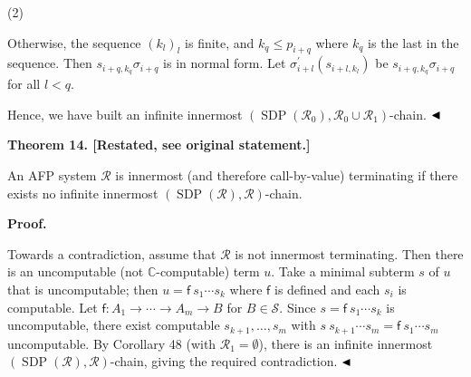 \documentclass[10pt,a4paper]{amsart}
\begin{document}
 
 
\par\noindent  (2) 
 
Otherwise, the sequence $(k_{l})_{l}$ is finite, and $k_{q}\leq p_{i+q}$ where $k_{q}$ is the last in the sequence. Then $s_{i+q,k_{q}}\sigma_{i+q}$ is in normal form. Let $\sigma^{\prime}_{i+l}(s_{i+l,k_{l}})$ be $s_{i+q,k_{q}}\sigma_{i+q}$ for all $l<q$.\par
 
 
  
 
 
Hence, we have built an infinite innermost $(\operatorname{SDP}(\mathcal{R}_{0}),\mathcal{R}_{0}\cup\mathcal{R}_{1})$-chain. $\hfill\blacktriangleleft$\par
 
 
 
 
\par\medskip\noindent\textbf{Theorem 14. [Restated, see original statement.]}\par
 
 
An AFP system $\mathcal{R}$ is innermost (and therefore call-by-value) terminating if there exists no infinite innermost $(\operatorname{SDP}(\mathcal{R}),\mathcal{R})$-chain.\par
 
 
 
 
 
 
\par\medskip\noindent\textbf{Proof.}\par
 
 
Towards a contradiction, assume that $\mathcal{R}$ is not innermost terminating. Then there is an uncomputable (not $\mathbb{C}$-computable) term $u$. Take a minimal subterm $s$ of $u$ that is uncomputable; then $u={\mathsf{f}}\ {{s}_{1}\cdots{s}_{k}}$ where $\mathsf{f}$ is defined and each $s_{i}$ is computable. Let $\mathsf{f}:{A}_{1}\rightarrow\cdots\rightarrow{A}_{m}\rightarrow B$ for $B\in\mathcal{S}$. Since $s={\mathsf{f}}\ {{s}_{1}\cdots{s}_{k}}$ is uncomputable, there exist computable ${s}_{k+1},\ldots,{s}_{m}$ with ${s}\ {{s}_{k+1}\cdots{s}_{m}}={\mathsf{f}}\ {{s}_{1}\cdots{s}_{m}}$ uncomputable. By Corollary 48 (with $\mathcal{R}_{1}=\emptyset$), there is an infinite innermost $(\operatorname{SDP}(\mathcal{R}),\mathcal{R})$-chain, giving the required contradiction. $\hfill\blacktriangleleft$\par
 
\end{document}
